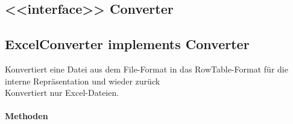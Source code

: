 \subsection{<{<{interface}>}> Converter}

\subsection{ExcelConverter implements Converter}
Konvertiert eine Datei aus dem File-Format in das RowTable-Format für die interne Repräsentation und wieder zurück \\

Konvertiert nur Excel-Dateien. \\

\paragraph{Methoden}
